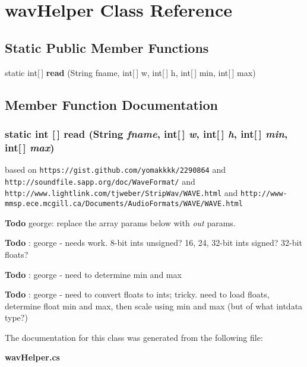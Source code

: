 \section{wav\-Helper Class Reference}
\label{class_c_s_image_viewer_1_1wav_helper}
\subsection*{Static Public Member Functions}
\begin{CompactItemize}
\item 
static int[$\,$] {\bf read} (String fname, int[$\,$] w, int[$\,$] h, int[$\,$] min, int[$\,$] max)
\end{CompactItemize}


\subsection{Member Function Documentation}
\subsubsection{\setlength{\rightskip}{0pt plus 5cm}static int [$\,$] read (String {\em fname}, int[$\,$] {\em w}, int[$\,$] {\em h}, int[$\,$] {\em min}, int[$\,$] {\em max})\hspace{0.3cm}{\tt  [static]}}\label{class_c_s_image_viewer_1_1wav_helper_4589e2b0a539d4d8967a87103d03618a}


based on {\tt https://gist.github.com/yomakkkk/2290864} and {\tt http://soundfile.sapp.org/doc/Wave\-Format/} and {\tt http://www.lightlink.com/tjweber/Strip\-Wav/WAVE.html} and {\tt http://www-mmsp.ece.mcgill.ca/Documents/Audio\-Formats/WAVE/WAVE.html} \begin{Desc}
\item[{\bf Todo}]george: replace the array params below with {\em out\/} params. \end{Desc}
\begin{Desc}
\item[{\bf Todo}]: george - needs work. 8-bit ints unsigned? 16, 24, 32-bit ints signed? 32-bit floats? \end{Desc}
\begin{Desc}
\item[{\bf Todo}]: george - need to determine min and max \end{Desc}


\begin{Desc}
\item[{\bf Todo}]: george - need to convert floats to ints; tricky. need to load floats, determine float min and max, then scale using min and max (but of what intdata type?) \end{Desc}


The documentation for this class was generated from the following file:\begin{CompactItemize}
\item 
{\bf wav\-Helper.cs}\end{CompactItemize}
